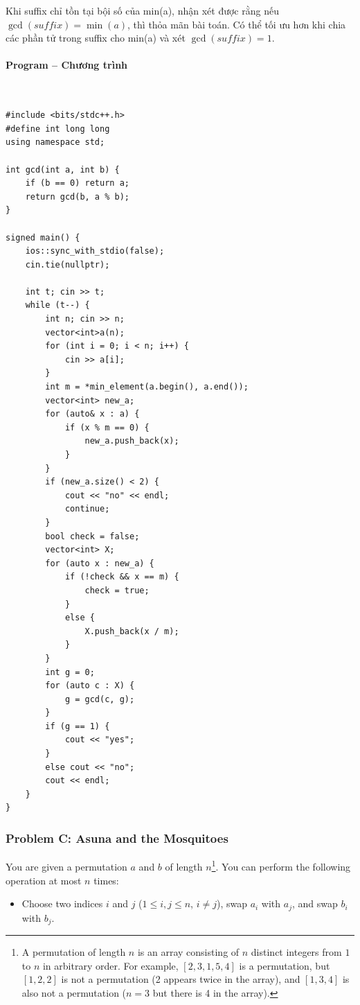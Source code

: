 \documentclass{article}
\begin{document}
Khi suffix chỉ tồn tại bội số của min(a), nhận xét được rằng nếu $\gcd(suffix) = \min(a)$, thì thỏa mãn bài toán. Có thể tối ưu hơn khi chia các phần tử trong suffix cho min(a) và xét $\gcd(suffix) = 1$.

\paragraph{Program -- Chương trình} \mbox{} \\

\begin{lstlisting}
#include <bits/stdc++.h>
#define int long long
using namespace std;

int gcd(int a, int b) {
	if (b == 0) return a;
	return gcd(b, a % b);
}

signed main() {
	ios::sync_with_stdio(false);
	cin.tie(nullptr);

	int t; cin >> t;
	while (t--) {
		int n; cin >> n;
		vector<int>a(n);
		for (int i = 0; i < n; i++) {
			cin >> a[i];
		}
		int m = *min_element(a.begin(), a.end());
		vector<int> new_a;
		for (auto& x : a) {
			if (x % m == 0) {
				new_a.push_back(x);
			}
		}
		if (new_a.size() < 2) {
			cout << "no" << endl;
			continue;
		}
		bool check = false;
		vector<int> X;
		for (auto x : new_a) {
			if (!check && x == m) {
				check = true;
			}
			else {
				X.push_back(x / m);
			}
		}
		int g = 0;
		for (auto c : X) {
			g = gcd(c, g);
		}
		if (g == 1) {
			cout << "yes";
		}
		else cout << "no";
		cout << endl;
	}
}

\end{lstlisting}

\subsubsection{Problem C: Asuna and the Mosquitoes}

You are given a permutation $a$ and $b$ of length $n$\footnote{
A permutation of length $n$ is an array consisting of $n$ distinct integers from $1$ to $n$ in arbitrary order. For example, $[2,3,1,5,4]$ is a permutation, but $[1,2,2]$ is not a permutation (2 appears twice in the array), and $[1,3,4]$ is also not a permutation ($n = 3$ but there is 4 in the array).
}.
You can perform the following operation at most $n$ times:
\begin{itemize}
    \item Choose two indices $i$ and $j$ ($1 \le i, j \le n$, $i \ne j$), swap $a_i$ with $a_j$, and swap $b_i$ with $b_j$.
\end{itemize}
\end{document}
